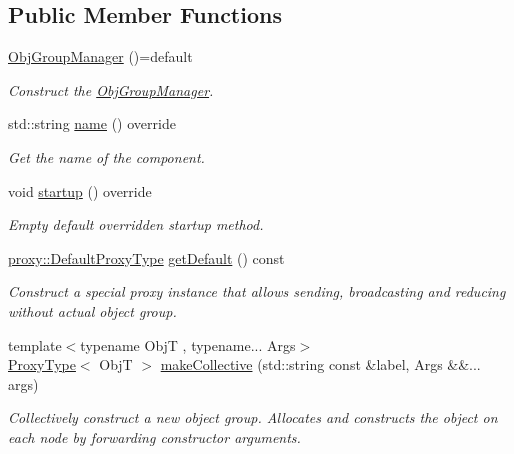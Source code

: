 \subsection*{Public Member Functions}
\begin{DoxyCompactItemize}
\item 
\hyperlink{structvt_1_1objgroup_1_1_obj_group_manager_a2de45aef25bff09a2fafabe227aa0ee7}{Obj\+Group\+Manager} ()=default
\begin{DoxyCompactList}\small\item\em Construct the \hyperlink{structvt_1_1objgroup_1_1_obj_group_manager}{Obj\+Group\+Manager}. \end{DoxyCompactList}\item 
std\+::string \hyperlink{structvt_1_1objgroup_1_1_obj_group_manager_a92c0b07c2d90063c40087f625880cca3}{name} () override
\begin{DoxyCompactList}\small\item\em Get the name of the component. \end{DoxyCompactList}\item 
void \hyperlink{structvt_1_1objgroup_1_1_obj_group_manager_ac05c002ff7fd23a39539cc8f4571bdf5}{startup} () override
\begin{DoxyCompactList}\small\item\em Empty default overridden startup method. \end{DoxyCompactList}\item 
\hyperlink{namespacevt_1_1objgroup_1_1proxy_ac7e0a0acb3b31d5469a603de08192adc}{proxy\+::\+Default\+Proxy\+Type} \hyperlink{structvt_1_1objgroup_1_1_obj_group_manager_a4447b8f4881710bc7b0b7a37de9d10b9}{get\+Default} () const
\begin{DoxyCompactList}\small\item\em Construct a special proxy instance that allows sending, broadcasting and reducing without actual object group. \end{DoxyCompactList}\item 
{\footnotesize template$<$typename ObjT , typename... Args$>$ }\\\hyperlink{structvt_1_1objgroup_1_1_obj_group_manager_aea65eef52f240a52210132eef5ce591f}{Proxy\+Type}$<$ ObjT $>$ \hyperlink{structvt_1_1objgroup_1_1_obj_group_manager_a50e0d8498d142a05773ed5a046803b2b}{make\+Collective} (std\+::string const \&label, Args \&\&... args)
\begin{DoxyCompactList}\small\item\em Collectively construct a new object group. Allocates and constructs the object on each node by forwarding constructor arguments. \end{DoxyCompactList}\item 

\end{DoxyCompactItemize}
